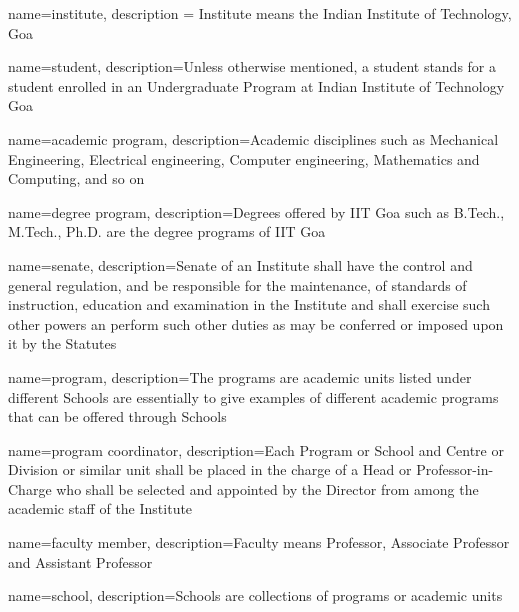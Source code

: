 {
    name={institute},
    description = {Institute means the Indian Institute of Technology, Goa}
}

{
        name=student,
        description={Unless otherwise mentioned, a student stands for a student enrolled in an Undergraduate Program at Indian Institute of Technology Goa}
}

{
        name=academic program,
        description={Academic disciplines such as Mechanical Engineering, Electrical engineering, Computer engineering, Mathematics and Computing, and so on}
}

{
        name=degree program,
        description={Degrees offered by IIT Goa such as B.Tech., M.Tech., Ph.D. are the degree programs of IIT Goa}
}

{
    name=senate,
    description={Senate of an Institute shall have the control and general regulation, and be responsible for the maintenance, of standards of instruction, education and examination in the Institute and shall exercise such other powers an perform such other duties as may be conferred or imposed upon it by the Statutes}
}

{
    name=program,
    description={The programs are academic units listed under different Schools are essentially to give examples of different academic programs that can be offered through Schools}
}

{
    name=program coordinator,
    description={Each Program or School and Centre or Division or similar unit shall be placed in the charge of a Head or Professor-in-Charge who shall be selected and appointed by the Director from among the academic staff of the Institute}
}

{
    name=faculty member,
    description={Faculty means Professor, Associate Professor and Assistant Professor}
}

{
    name=school,
    description={Schools are collections of programs or academic units}
}

